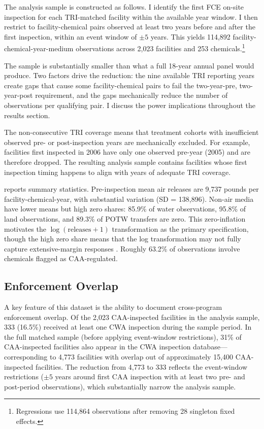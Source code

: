 \documentclass[12pt]{article}
\begin{document}
The analysis sample is constructed as follows. I identify the first FCE on-site inspection for each TRI-matched facility within the available year window. I then restrict to facility-chemical pairs observed at least two years before and after the first inspection, within an event window of $\pm 5$ years. This yields 114,892 facility-chemical-year-medium observations across 2,023 facilities and 253 chemicals.\footnote{Regressions use 114,864 observations after removing 28 singleton fixed effects.}

The sample is substantially smaller than what a full 18-year annual panel would produce. Two factors drive the reduction: the nine available TRI reporting years create gaps that cause some facility-chemical pairs to fail the two-year-pre, two-year-post requirement, and the gaps mechanically reduce the number of observations per qualifying pair. I discuss the power implications throughout the results section.

The non-consecutive TRI coverage means that treatment cohorts with insufficient observed pre- or post-inspection years are mechanically excluded. For example, facilities first inspected in 2006 have only one observed pre-year (2005) and are therefore dropped. The resulting analysis sample contains facilities whose first inspection timing happens to align with years of adequate TRI coverage.



 reports summary statistics. Pre-inspection mean air releases are 9,737 pounds per facility-chemical-year, with substantial variation (SD = 138,896). Non-air media have lower means but high zero shares: 85.9\% of water observations, 95.8\% of land observations, and 89.3\% of POTW transfers are zero. This zero-inflation motivates the $\log(\text{releases} + 1)$ transformation as the primary specification, though the high zero share means that the log transformation may not fully capture extensive-margin responses \citep{santosilva2006}. Roughly 63.2\% of observations involve chemicals flagged as CAA-regulated.

\subsection{Enforcement Overlap}

A key feature of this dataset is the ability to document cross-program enforcement overlap. Of the 2,023 CAA-inspected facilities in the analysis sample, 333 (16.5\%) received at least one CWA inspection during the sample period. In the full matched sample (before applying event-window restrictions), 31\% of CAA-inspected facilities also appear in the CWA inspection database---corresponding to 4,773 facilities with overlap out of approximately 15,400 CAA-inspected facilities. The reduction from 4,773 to 333 reflects the event-window restrictions ($\pm 5$ years around first CAA inspection with at least two pre- and post-period observations), which substantially narrow the analysis sample.
\end{document}
